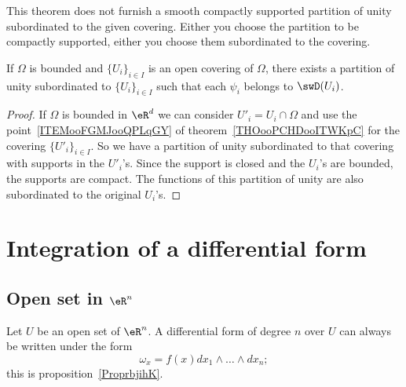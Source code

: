 \begin{remark}
    This theorem does not furnish a smooth compactly supported partition of unity subordinated to the given covering. Either you choose the partition to be compactly supported, either you choose them subordinated to the covering.
\end{remark}

\begin{corollary}  \label{CORooMSWPooCxvuhm}
    If \( \Omega\) is bounded and \( \{U_i \}_{i\in I}\) is an open covering of \( \Omega\), there exists a partition of unity subordinated to \( \{ U_i \}_{i\in I}\) such that each \( \psi_i\) belongs to \( \swD(U_i)\).
\end{corollary}

\begin{proof}
    If \( \Omega\) is bounded in \( \eR^d\) we can consider \( U'_i=U_i\cap \Omega\) and use the point~\ref{ITEMooFGMJooQPLqGY} of theorem~\ref{THOooPCHDooITWKpC} for the covering \( \{ U'_i \}_{i\in I}\). So we have a partition of unity subordinated to that covering with supports in the \( U'_i\)'s. Since the support is closed and the \( U_i\)'s are bounded, the supports are compact. The functions of this partition of unity are also subordinated to the original \( U_i\)'s.
\end{proof}

\section{Integration of a differential form}

\subsection{Open set in \( \eR^n\)}

Let \( U\) be an open set of \( \eR^n\). A differential form of degree \( n\) over \( U\) can always be written under the form
\begin{equation}
    \omega_x=f(x)dx_1\wedge\ldots\wedge dx_n;
\end{equation}
this is proposition~\ref{ProprbjihK}.

